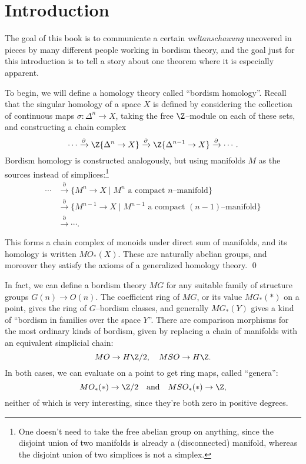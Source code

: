 
\setcounter{chapter}{-1}
\chapter{Introduction}

\label{IntroductionSection}

The goal of this book is to communicate a certain \textit{weltanschauung} uncovered in pieces by many different people working in bordism theory, and the goal just for this introduction is to tell a story about one theorem where it is especially apparent.

To begin, we will define a homology theory called ``bordism homology''.  Recall that the singular homology of a space $X$ is defined by considering the collection of continuous maps $\sigma: \Delta^n \to X$, taking the free $\Z$--module on each of these sets, and constructing a chain complex \[\cdots \xrightarrow{\partial} \Z\{\Delta^n \to X\} \xrightarrow{\partial} \Z\{\Delta^{n-1} \to X\} \xrightarrow{\partial} \cdots.\]  Bordism homology is constructed analogously, but using manifolds $M$ as the sources instead of simplices:\footnote{One doesn't need to take the free abelian group on anything, since the disjoint union of two manifolds is already a (disconnected) manifold, whereas the disjoint union of two simplices is not a simplex.}
\begin{align*}
\cdots & \xrightarrow{\partial} \{M^n \to X \mid \text{$M^n$ a compact $n$--manifold}\} \\
& \xrightarrow{\partial} \{M^{n-1} \to X \mid \text{$M^{n-1}$ a compact $(n-1)$--manifold}\} \\
& \xrightarrow{\partial} \cdots.
\end{align*}

\begin{lemma}
This forms a chain complex of monoids under direct sum of manifolds, and its homology is written $MO_*(X)$.  These are naturally abelian groups, and moreover they satisfy the axioms of a generalized homology theory. \qed
\end{lemma}

In fact, we can define a bordism theory $MG$ for any suitable family of structure groups $G(n) \to O(n)$.  The coefficient ring of $MG$, or its value $MG_*(*)$ on a point, gives the ring of $G$--bordism classes, and generally $MG_*(Y)$ gives a kind of ``bordism in families over the space $Y$''.  There are comparison morphisms for the most ordinary kinds of bordism, given by replacing a chain of manifolds with an equivalent simplicial chain: \[MO \to H\Z/2, \quad MSO \to H\Z.\] In both cases, we can evaluate on a point to get ring maps, called ``genera'': \[MO_*(*) \to \Z/2 \quad \text{and} \quad MSO_*(*) \to \Z,\] neither of which is very interesting, since they're both zero in positive degrees.

